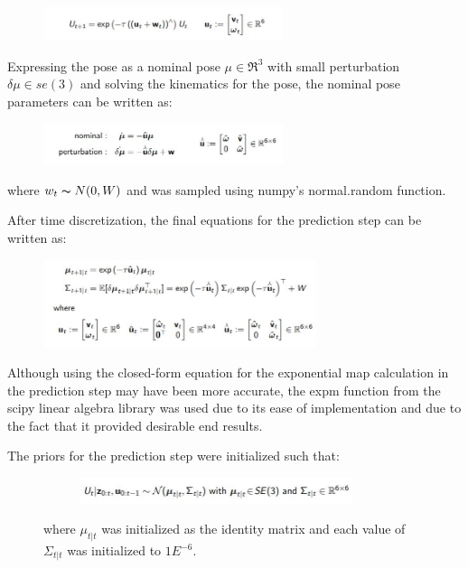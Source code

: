 \documentclass[conference]{IEEEtran}
\begin{document}
\begin{figure}[H]
\centerline{\includegraphics[width=70mm]{eqns/eq1.jpg}}
\end{figure} 


Expressing the pose as a nominal pose $\mu \in \Re^{3}$ with small perturbation $\delta \mu \in se(3)$ and solving the kinematics for the pose, the nominal pose parameters can be written as:

\begin{figure}[H]
\centerline{\includegraphics[width=70mm]{eqns/eq4.jpg}}
\end{figure} 

where $w_{t} \thicksim N(0,W)$ and was sampled using numpy's normal.random function.


After time discretization, the final equations for the prediction step can be written as:

\begin{figure}[H]
\centerline{\includegraphics[width=80mm]{eqns/eq6.jpg}}
\end{figure} 

Although using the closed-form equation for the exponential map calculation in the prediction step may have been more accurate, the expm function from the scipy linear algebra library was used due to its ease of implementation and due to the fact that it provided desirable end results.

The priors for the prediction step were initialized such that:
\begin{figure}[H]\begin{figure}[H]
\centerline{\includegraphics[width=80mm]{eqns/prior_pred.jpg}}
\end{figure} 

where $\mu_{t|t}$ was initialized as the identity matrix and each value of $\Sigma_{t|t}$ was initialized to $1E^{-6}$. 
\end{figure} 
\end{document}
